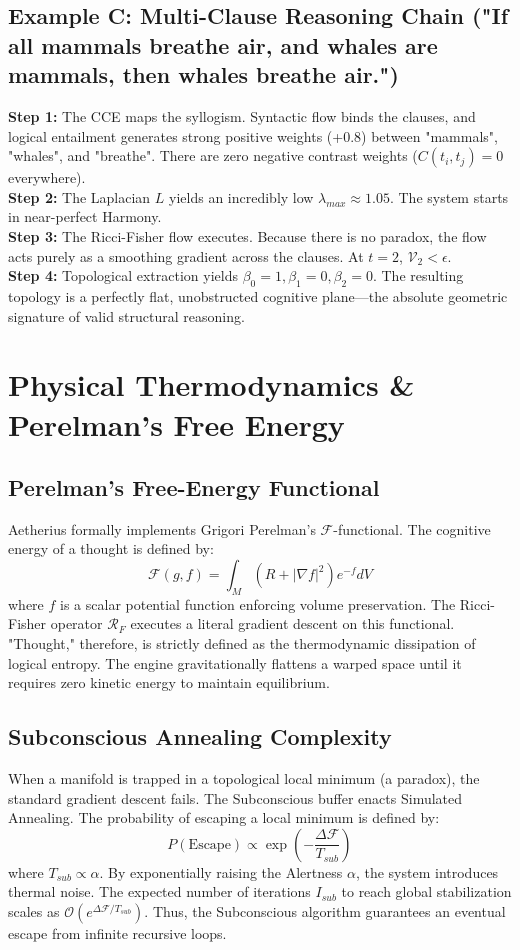 \documentclass[11pt,a4paper,twocolumn]{article}
\begin{document}
\subsection{Example C: Multi-Clause Reasoning Chain ("If all mammals breathe air, and whales are mammals, then whales breathe air.")}
\textbf{Step 1:} The CCE maps the syllogism. Syntactic flow binds the clauses, and logical entailment generates strong positive weights (+0.8) between "mammals", "whales", and "breathe". There are zero negative contrast weights ($C(t_i, t_j) = 0$ everywhere).\\
\textbf{Step 2:} The Laplacian $L$ yields an incredibly low $\lambda_{max} \approx 1.05$. The system starts in near-perfect Harmony.\\
\textbf{Step 3:} The Ricci-Fisher flow executes. Because there is no paradox, the flow acts purely as a smoothing gradient across the clauses. At $t=2$, $\mathcal{V}_2 < \epsilon$.\\
\textbf{Step 4:} Topological extraction yields $\beta_0 = 1, \beta_1 = 0, \beta_2 = 0$. The resulting topology is a perfectly flat, unobstructed cognitive plane—the absolute geometric signature of valid structural reasoning.

\section{Physical Thermodynamics \& Perelman's Free Energy}

\subsection{Perelman’s Free-Energy Functional}
Aetherius formally implements Grigori Perelman's $\mathcal{F}$-functional. The cognitive energy of a thought is defined by:
\[ \mathcal{F}(g, f) = \int_M (R + |\nabla f|^2) e^{-f} dV \]
where $f$ is a scalar potential function enforcing volume preservation.
The Ricci-Fisher operator $\mathcal{R}_F$ executes a literal gradient descent on this functional. "Thought," therefore, is strictly defined as the thermodynamic dissipation of logical entropy. The engine gravitationally flattens a warped space until it requires zero kinetic energy to maintain equilibrium.

\subsection{Subconscious Annealing Complexity}
When a manifold is trapped in a topological local minimum (a paradox), the standard gradient descent fails. The Subconscious buffer enacts Simulated Annealing. The probability of escaping a local minimum is defined by:
\[ P(\text{Escape}) \propto \exp\left(-\frac{\Delta \mathcal{F}}{T_{sub}}\right) \]
where $T_{sub} \propto \alpha$. By exponentially raising the Alertness $\alpha$, the system introduces thermal noise. The expected number of iterations $I_{sub}$ to reach global stabilization scales as $\mathcal{O}(e^{\Delta \mathcal{F} / T_{sub}})$. Thus, the Subconscious algorithm guarantees an eventual escape from infinite recursive loops.
\end{document}
